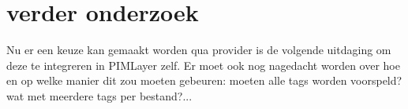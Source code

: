 \section{verder onderzoek}
Nu er een keuze kan gemaakt worden qua provider is de volgende uitdaging om deze te integreren in PIMLayer zelf. Er moet ook nog nagedacht worden over hoe en op welke manier dit zou moeten gebeuren: moeten alle tags worden voorspeld? wat met meerdere tags per bestand?...




